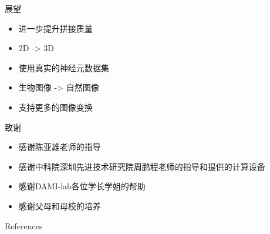 \documentclass[10pt]{beamer}
\newcommand{\themename}{\textbf{\textsc{metropolis}}\xspace}
\begin{document}
\begin{frame}[fragile]{展望}
  \begin{itemize}
    \item 进一步提升拼接质量
    \item 2D -> 3D
    \item 使用真实的神经元数据集
    \item 生物图像 -> 自然图像
    \item 支持更多的图像变换
  \end{itemize}
\end{frame}

\begin{frame}[fragile]{致谢}
  \begin{itemize}
    \item 感谢陈亚雄老师的指导
    \item 感谢中科院深圳先进技术研究院周鹏程老师的指导和提供的计算设备
    \item 感谢DAMI-lab各位学长学姐的帮助
    \item 感谢父母和母校的培养
  \end{itemize}
\end{frame}

\appendix

\begin{frame}{References}
  
  

\end{frame}







\end{document}
